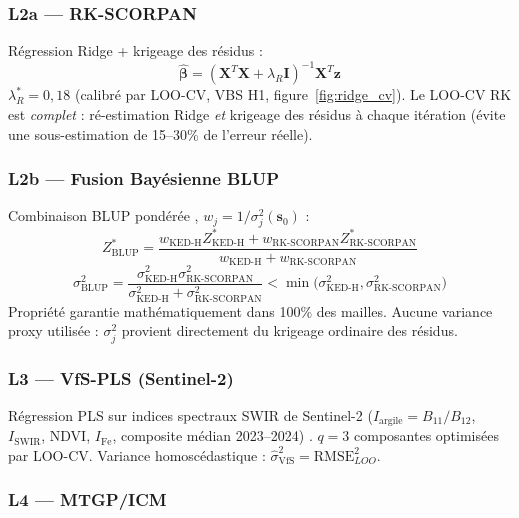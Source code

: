 \documentclass[10pt,a4paper,twocolumn]{article}
\newcommand{\bs}{\mathbf{s}}
\newcommand{\KED}{\text{KED-H}}
\newcommand{\RK}{\text{RK-SCORPAN}}
\newcommand{\BLUP}{\text{BLUP}}
\begin{document}
\subsubsection{L2a — RK-SCORPAN}
\label{subsec:rk}

Régression Ridge + krigeage des résidus \cite{hengl2007regression} :
\begin{equation}
  \hat{\bm{\beta}} = (\mathbf{X}^T\mathbf{X} + \lambda_R \mathbf{I})^{-1}\mathbf{X}^T\mathbf{z}
  \label{eq:rk}
\end{equation}
$\lambda_R^* = 0{,}18$ (calibré par LOO-CV, VBS H1, figure~\ref{fig:ridge_cv}).
Le LOO-CV RK est \emph{complet} : ré-estimation Ridge \emph{et} krigeage des
résidus à chaque itération (évite une sous-estimation de 15--30\%
de l'erreur réelle).

\subsubsection{L2b — Fusion Bayésienne BLUP}
\label{subsec:fusion}

Combinaison BLUP pondérée \cite{chilesdelfiner2012}, $w_j = 1/\sigma^2_j(\bs_0)$ :
\begin{equation}
  Z^*_{\BLUP} =
    \frac{w_{\KED} Z^*_{\KED} + w_{\RK} Z^*_{\RK}}{w_{\KED}+w_{\RK}}
  \label{eq:blup}
\end{equation}
\begin{equation}
  \sigma^2_{\BLUP} = \frac{\sigma^2_{\KED}\sigma^2_{\RK}}
    {\sigma^2_{\KED}+\sigma^2_{\RK}}
    < \min\!\bigl(\sigma^2_{\KED},\sigma^2_{\RK}\bigr)
  \label{eq:blup_var}
\end{equation}
Propriété garantie mathématiquement dans 100\% des mailles.
Aucune variance proxy utilisée : $\sigma^2_j$ provient directement du
krigeage ordinaire des résidus.

\subsubsection{L3 — VfS-PLS (Sentinel-2)}
\label{subsec:vfs}

Régression PLS sur indices spectraux SWIR de Sentinel-2
($I_{\mathrm{argile}}=B_{11}/B_{12}$, $I_{\mathrm{SWIR}}$, NDVI, $I_{\mathrm{Fe}}$,
composite médian 2023--2024) \cite{viscarra2006data}.
$q=3$ composantes optimisées par LOO-CV.
Variance homoscédastique : $\hat{\sigma}^2_{\mathrm{VfS}} = \mathrm{RMSE}_{LOO}^2$.

\subsubsection{L4 — MTGP/ICM}
\label{subsec:mtgp}
\end{document}
